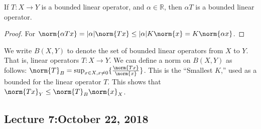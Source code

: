 \documentclass[crop=false,class=article,oneside]{standalone}
\begin{document}
            \begin{theorem}
                If $T:X\rightarrow{Y}$ is a bounded linear operator, and
                $\alpha\in\mathbb{R}$, then $\alpha{T}$ is a bounded
                linear operator.
            \end{theorem}
            \begin{proof}
                For
                $\norm{\alpha{Tx}}=|\alpha|\norm{Tx}%
                 \leq|\alpha|K\norm{x}=K\norm{\alpha{x}}$.
            \end{proof}
            We write $B(X,Y)$ to denote the set of bounded linear
            operators from $X$ to $Y$. That is, linear operators
            $T:X\rightarrow{Y}$.
            We can define a norm on $B(X,Y)$ as follows:
            $\norm{T}_{B}%
             =\sup_{x\in{X},x\ne{0}}\{\frac{\norm{Tx}}{\norm{x}}\}$.
            This is the ``Smallest $K$,'' used as a bounded for the linear
            operator $T$. This shows that
            $\norm{Tx}_{Y}\leq\norm{T}_{B}\norm{x}_{X}$.
    \subsection{Lecture 7:October 22, 2018}
\end{document}
